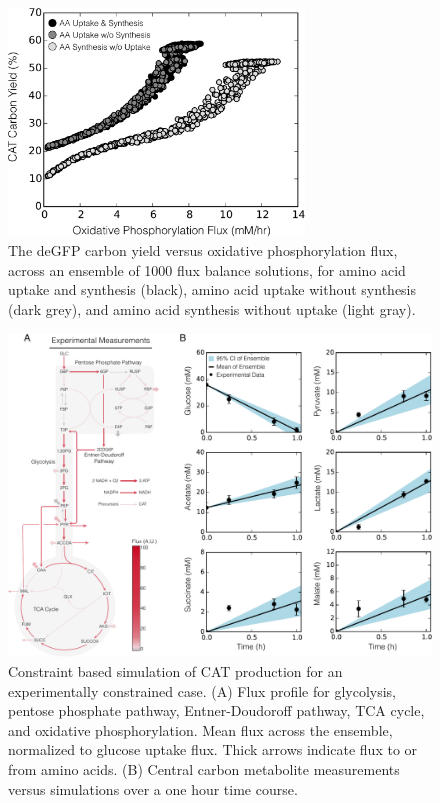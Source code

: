 \documentclass[journal=asbcd6,manuscript=article]{achemso}
\begin{document}
\clearpage

\begin{figure}[t!]
\includegraphics[width=0.7\textwidth]{./figs/Fig-4-OxyPhox-versus-Carbon-Yield.pdf}
\caption{The deGFP carbon yield versus oxidative phosphorylation flux, across an ensemble of 1000 flux balance solutions, for amino acid uptake and synthesis (black), amino acid uptake without synthesis (dark grey), and amino acid synthesis without uptake (light gray).}
\label{fig:oxphos_yield}
\end{figure}


\clearpage

\begin{figure}[t!]
\includegraphics[width=1.00\textwidth]{./figs/Fig-6-FluxDistribition-Experimental.pdf}
\caption{Constraint based simulation of CAT production for an experimentally constrained case.
(A) Flux profile for glycolysis, pentose phosphate pathway, Entner-Doudoroff pathway, TCA cycle, and oxidative phosphorylation.
Mean flux across the ensemble, normalized to glucose uptake flux. Thick arrows indicate flux to or from amino acids.
(B) Central carbon metabolite measurements versus simulations over a one hour time course.}
\label{fig:flux_exp}
\end{figure}
\end{document}
